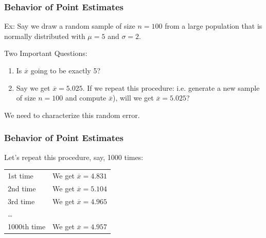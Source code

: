 \documentclass[slides]{beamer}
\newcommand{\blue}[1]{\textcolor{blue2}{#1}}
\newcommand{\xbar}{\overline{x}}
\begin{document}
\begin{frame}[fragile]
\frametitle{Behavior of Point Estimates}
Ex:  Say we draw a random sample of size $n=100$ from a large population that is normally distributed with $\mu=5$ and $\sigma=2$.

\pause \vskip 0.5cm

\blue{Two Important Questions}:
\begin{enumerate}
\pause \item Is $\xbar$ going to be exactly 5?
\pause \item Say we get $\overline{x}=5.025$.  If we repeat this procedure: i.e. generate a \blue{new} sample of size $n=100$ and compute $\overline{x}$), will we get $\overline{x} = 5.025$?
\end{enumerate}

\pause We need to characterize this random error.

\end{frame}


\begin{frame}[fragile]
\frametitle{Behavior of Point Estimates}
Let's repeat this procedure, say, 1000 times:

\pause \begin{center}
\begin{tabular}{ll}
1st time & We get $\overline{x}=4.831$\\
2nd time & We get $\overline{x}=5.104$\\
3rd time & We get $\overline{x}=4.965$\\
\ldots & \\
1000th time & We get $\overline{x}=4.957$\\
\end{tabular}
\end{center}

\end{frame}
\end{document}
